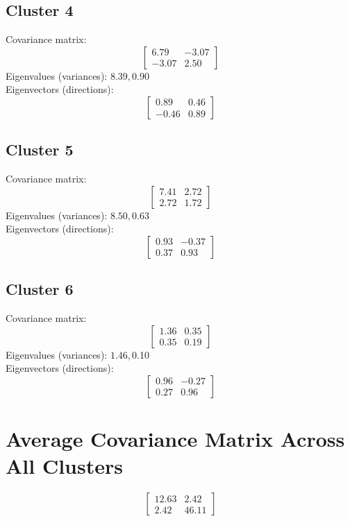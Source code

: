 \documentclass{article}
\begin{document}
\subsection*{Cluster 4}
Covariance matrix:
\[\begin{bmatrix}6.79 & -3.07 \\-3.07 & 2.50\end{bmatrix}\]
Eigenvalues (variances): $ 8.39, $0.90\\
Eigenvectors (directions):
\[\begin{bmatrix}0.89 & 0.46 \\-0.46 & 0.89\end{bmatrix}\]
\subsection*{Cluster 5}
Covariance matrix:
\[\begin{bmatrix}7.41 & 2.72 \\2.72 & 1.72\end{bmatrix}\]
Eigenvalues (variances): $ 8.50, $0.63\\
Eigenvectors (directions):
\[\begin{bmatrix}0.93 & -0.37 \\0.37 & 0.93\end{bmatrix}\]
\subsection*{Cluster 6}
Covariance matrix:
\[\begin{bmatrix}1.36 & 0.35 \\0.35 & 0.19\end{bmatrix}\]
Eigenvalues (variances): $ 1.46, $0.10\\
Eigenvectors (directions):
\[\begin{bmatrix}0.96 & -0.27 \\0.27 & 0.96\end{bmatrix}\]
\section*{Average Covariance Matrix Across All Clusters}
\[\begin{bmatrix}12.63 & 2.42 \\2.42 & 46.11\end{bmatrix}\]
\end{document}
